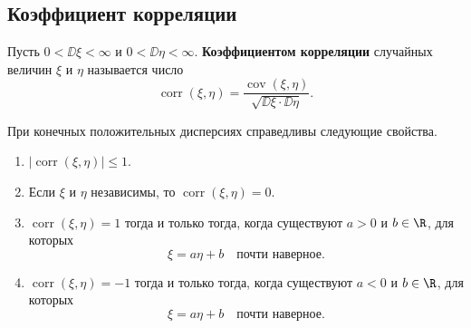 \clearpage
\begingroup
{}
\everymath{\textstyle}
\subsection{Коэффициент корреляции}

\begin{definition}
    Пусть $0<\DD\xi<\infty$ и $0<\DD\eta<\infty$.
    \textbf{Коэффициентом корреляции} случайных величин $\xi$ и $\eta$
    называется число
    \[
        \operatorname{corr}(\xi,\eta)
        =\frac{\operatorname{cov}(\xi,\eta)}
        {\sqrt{\DD\xi\cdot\DD\eta}}.
    \]
\end{definition}

\begin{theorem}
    При конечных положительных дисперсиях справедливы следующие свойства.
    \begin{enumerate}
        \item $|\operatorname{corr}(\xi,\eta)|\leq1$.
        \item Если $\xi$ и $\eta$ независимы, то
        $\operatorname{corr}(\xi,\eta)=0$.
        \item $\operatorname{corr}(\xi,\eta)=1$ тогда и только тогда,
        когда существуют $a>0$ и $b\in\R$, для которых
        \[
            \xi=a\eta+b\quad\text{почти наверное}.
        \]
        \item $\operatorname{corr}(\xi,\eta)=-1$ тогда и только тогда,
        когда существуют $a<0$ и $b\in\R$, для которых
        \[
            \xi=a\eta+b\quad\text{почти наверное}.
        \]
    \end{enumerate}
\end{theorem}
\endgroup
